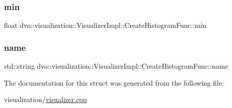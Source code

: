 \subsubsection{\texorpdfstring{min}{min}}
{\footnotesize\ttfamily float dvo\+::visualization\+::\+Visualizer\+Impl\+::\+Create\+Histogram\+Func\+::min}

\mbox{\label{structdvo_1_1visualization_1_1_visualizer_impl_1_1_create_histogram_func_a638ab4faaac71fc668bc6fb5e5c507b1}} 
\subsubsection{\texorpdfstring{name}{name}}
{\footnotesize\ttfamily std\+::string dvo\+::visualization\+::\+Visualizer\+Impl\+::\+Create\+Histogram\+Func\+::name}



The documentation for this struct was generated from the following file\+:\begin{DoxyCompactItemize}
\item 
visualization/\mbox{\hyperlink{visualizer_8cpp}{visualizer.\+cpp}}\end{DoxyCompactItemize}
